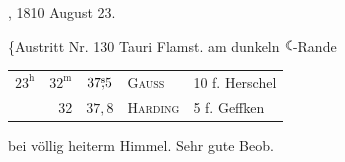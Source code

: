 \clearpage\begingroup

\hypertarget{native-276-5}{}
\def\ObsMoon{\mathord{\tikz[baseline=-.1ex,x=1em,y=1em,line width=.04em]{
  \draw (.42,.69) .. controls (-.06,.68) and (-.06,.05) .. (.42,.04);
  \draw (.42,.69) .. controls (.10,.59) and (.10,.14) .. (.42,.04);}}}
\def\ObsCeresR{\mathord{\tikz[baseline=-.1ex,x=1em,y=1em,line width=.045em]{
  \draw (.10,.52) .. controls (.22,.76) and (.47,.64) .. (.44,.43) .. controls (.42,.25) and (.23,.22) .. (.13,.33);
  \draw (.19,.34)--(.19,-.05);
  \draw (.05,.10)--(.33,.10);}}}
, 1810 August 23.

\{Austritt Nr. 130 Tauri Flamst. am dunkeln $\ObsMoon$-Rande
\begin{center}\begin{tabular}{rrrll}
$23^{\mathrm h}$&$32^{\mathrm m}$&$37\mathord{\overset{\mathrm{s}}{,}}5$&\textsc{Gauss}&10 f. Herschel\\
&32&$37{,}8$&\textsc{Harding}&5 f. Geffken
\end{tabular}\end{center}
\noindent bei völlig heiterm Himmel. Sehr gute Beob.

